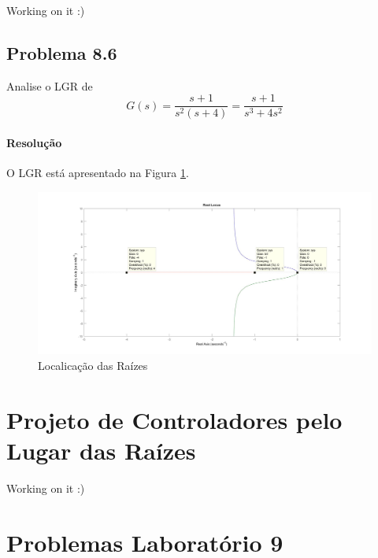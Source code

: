 \documentclass[
]{book}
\theoremstyle{definition}
\theoremstyle{definition}
\theoremstyle{definition}
\theoremstyle{remark}
\begin{document}
Working on it :)

\hypertarget{problema-8.6}{%
\section*{Problema 8.6}\label{problema-8.6}}

Analise o LGR de
\[
G(s) = \frac{s+1}{s^2(s+4)} = \frac{s+1}{s^3+4s^2}
\]

\hypertarget{resoluuxe7uxe3o-27}{%
\subsubsection*{Resolução}\label{resoluuxe7uxe3o-27}}

O LGR está apresentado na Figura \ref{fig:fig8R8}.

\begin{figure}

{\centering \includegraphics{Imagens/Lab8/Resolução/fig8} 

}

\caption{Localicação das Raízes}\label{fig:fig8R8}
\end{figure}

\hypertarget{projeto-de-controladores-pelo-lugar-das-rauxedzes}{%
\chapter{Projeto de Controladores pelo Lugar das Raízes}\label{projeto-de-controladores-pelo-lugar-das-rauxedzes}}

Working on it :)

\hypertarget{problemas-laboratuxf3rio-9}{%
\chapter*{Problemas Laboratório 9}\label{problemas-laboratuxf3rio-9}}
\end{document}
